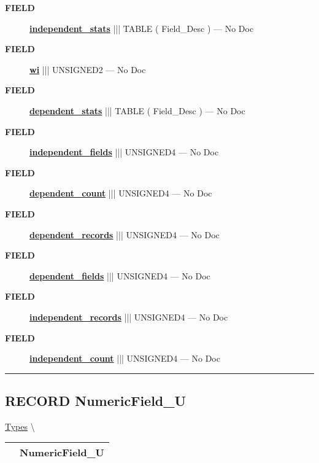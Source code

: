 \par
\begin{description}
\item [\colorbox{tagtype}{\color{white} \textbf{\textsf{FIELD}}}] \textbf{\underline{independent\_stats}} ||| TABLE ( Field\_Desc ) --- No Doc
\item [\colorbox{tagtype}{\color{white} \textbf{\textsf{FIELD}}}] \textbf{\underline{wi}} ||| UNSIGNED2 --- No Doc
\item [\colorbox{tagtype}{\color{white} \textbf{\textsf{FIELD}}}] \textbf{\underline{dependent\_stats}} ||| TABLE ( Field\_Desc ) --- No Doc
\item [\colorbox{tagtype}{\color{white} \textbf{\textsf{FIELD}}}] \textbf{\underline{independent\_fields}} ||| UNSIGNED4 --- No Doc
\item [\colorbox{tagtype}{\color{white} \textbf{\textsf{FIELD}}}] \textbf{\underline{dependent\_count}} ||| UNSIGNED4 --- No Doc
\item [\colorbox{tagtype}{\color{white} \textbf{\textsf{FIELD}}}] \textbf{\underline{dependent\_records}} ||| UNSIGNED4 --- No Doc
\item [\colorbox{tagtype}{\color{white} \textbf{\textsf{FIELD}}}] \textbf{\underline{dependent\_fields}} ||| UNSIGNED4 --- No Doc
\item [\colorbox{tagtype}{\color{white} \textbf{\textsf{FIELD}}}] \textbf{\underline{independent\_records}} ||| UNSIGNED4 --- No Doc
\item [\colorbox{tagtype}{\color{white} \textbf{\textsf{FIELD}}}] \textbf{\underline{independent\_count}} ||| UNSIGNED4 --- No Doc
\end{description}





\rule{\linewidth}{0.5pt}
\subsection*{\textsf{\colorbox{headtoc}{\color{white} RECORD}
NumericField\_U}}

\hypertarget{ecldoc:logisticregression.types.numericfield_u}{}
\hspace{0pt} \hyperlink{ecldoc:LogisticRegression.Types}{Types} \textbackslash 

{\renewcommand{\arraystretch}{1.5}
\begin{tabularx}{\textwidth}{|>{\raggedright\arraybackslash}l|X|}
\hline
\hspace{0pt}\mytexttt{\color{red} } & \textbf{NumericField\_U} \\
\hline
\end{tabularx}
}

